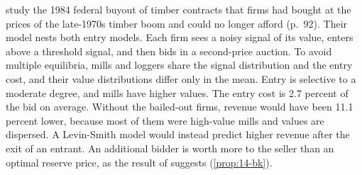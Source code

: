 \citet{RobertsSweeting2016} study the 1984 federal buyout of timber contracts that firms had bought at
the prices of the late-1970s timber boom and could no longer afford (p.~92). Their model nests both
entry models. Each firm sees a noisy signal of its value, enters above a threshold signal, and then
bids in a second-price auction. To avoid multiple equilibria, mills and loggers share the signal
distribution and the entry cost, and their value distributions differ only in the mean. Entry is
selective to a moderate degree, and mills have higher values. The entry cost is 2.7 percent of the bid
on average. Without the bailed-out firms, revenue would have been 11.1 percent lower, because most of
them were high-value mills and values are dispersed. A Levin-Smith model would instead predict higher
revenue after the exit of an entrant. An additional bidder is worth more to the seller than an optimal
reserve price, as the result of \citet{BulowKlemperer1996} suggests (\cref{prop:14-bk}).

